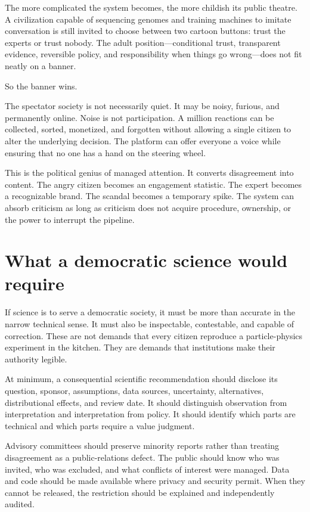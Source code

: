 ﻿\documentclass[12pt,a4paper]{book}
\begin{document}
The more complicated the system becomes, the more childish its public
theatre. A civilization capable of sequencing genomes and training machines
to imitate conversation is still invited to choose between two cartoon
buttons: trust the experts or trust nobody. The adult position---conditional
trust, transparent evidence, reversible policy, and responsibility when things
go wrong---does not fit neatly on a banner.

So the banner wins.

The spectator society is not necessarily quiet. It may be noisy, furious, and
permanently online. Noise is not participation. A million reactions can be
collected, sorted, monetized, and forgotten without allowing a single citizen
to alter the underlying decision. The platform can offer everyone a voice
while ensuring that no one has a hand on the steering wheel.

This is the political genius of managed attention. It converts disagreement
into content. The angry citizen becomes an engagement statistic. The expert
becomes a recognizable brand. The scandal becomes a temporary spike. The
system can absorb criticism as long as criticism does not acquire procedure,
ownership, or the power to interrupt the pipeline.

\section{What a democratic science would require}

If science is to serve a democratic society, it must be more than accurate in
the narrow technical sense. It must also be inspectable, contestable, and
capable of correction. These are not demands that every citizen reproduce a
particle-physics experiment in the kitchen. They are demands that institutions
make their authority legible.

At minimum, a consequential scientific recommendation should disclose its
question, sponsor, assumptions, data sources, uncertainty, alternatives,
distributional effects, and review date. It should distinguish observation
from interpretation and interpretation from policy. It should identify which
parts are technical and which parts require a value judgment.

Advisory committees should preserve minority reports rather than treating
disagreement as a public-relations defect. The public should know who was
invited, who was excluded, and what conflicts of interest were managed. Data
and code should be made available where privacy and security permit. When they
cannot be released, the restriction should be explained and independently
audited.
\end{document}
